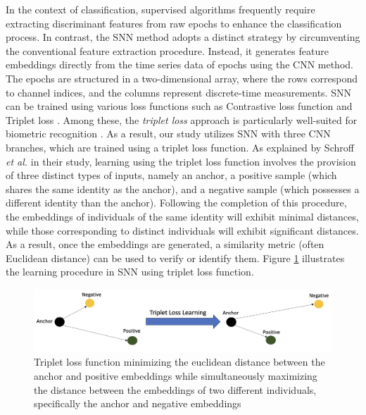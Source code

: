 In the context of classification, supervised algorithms frequently require extracting discriminant features from raw epochs to enhance the classification process. In contrast, the SNN method adopts a distinct strategy by circumventing the conventional feature extraction procedure. Instead, it generates feature embeddings directly from the time series data of epochs using the CNN method. The epochs are structured in a two-dimensional array, where the rows correspond to channel indices, and the columns represent discrete-time measurements. SNN can be trained using various loss functions such as Contrastive loss function and Triplet loss \cite{ghojogh2020fisher}. Among these, the \textit{triplet loss} approach is particularly well-suited for biometric recognition \cite{fallahi2023brainnet}. As a result, our study utilizes SNN with three CNN branches, which are trained using a triplet loss function. As explained by Schroff \textit{et al.} \cite{facenet} in their study, learning using the triplet loss function involves the provision of three distinct types of inputs, namely an anchor, a positive sample (which shares the same identity as the anchor), and a negative sample (which possesses a different identity than the anchor). Following the completion of this procedure, the embeddings of individuals of the same identity will exhibit minimal distances, while those corresponding to distinct individuals will exhibit significant distances. As a result, once the embeddings are generated, a similarity metric (often Euclidean distance) can be used to verify or identify them. Figure \ref{fig:Triplet Loss} illustrates the learning procedure in SNN using triplet loss function. 
\begin{figure}
    \centering
     \includegraphics[width=\textwidth]{figures/Siamese/Triplet_loss_updated.png}  
    
    \caption{Triplet loss function minimizing the euclidean distance between the anchor and positive embeddings while simultaneously maximizing the distance between the embeddings of two different individuals, specifically the anchor and negative embeddings}
    \label{fig:Triplet Loss}
\end{figure}

